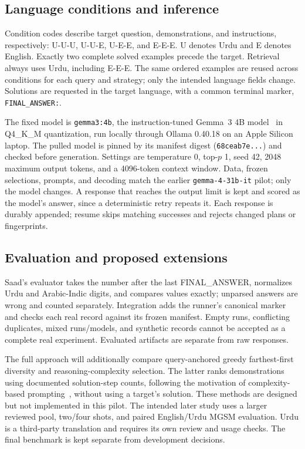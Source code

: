 \documentclass[conference]{IEEEtran}
\begin{document}
\subsection{Language conditions and inference}
Condition codes describe target question, demonstrations, and instructions, respectively: U-U-U, U-U-E, U-E-E, and E-E-E. U denotes Urdu and E denotes English. Exactly two complete solved examples precede the target. Retrieval always uses Urdu, including E-E-E. The same ordered examples are reused across conditions for each query and strategy; only the intended language fields change. Solutions are requested in the target language, with a common terminal marker, \texttt{FINAL\_ANSWER:}.

The fixed model is \texttt{gemma3:4b}, the instruction-tuned Gemma~3 4B model~\cite{gemma} in Q4\_K\_M quantization, run locally through Ollama 0.40.18 on an Apple Silicon laptop. The pulled model is pinned by its manifest digest (\texttt{68ceab7e...}) and checked before generation. Settings are temperature 0, top-$p$ 1, seed 42, 2048 maximum output tokens, and a 4096-token context window. Data, frozen selections, prompts, and decoding match the earlier \texttt{gemma-4-31b-it} pilot; only the model changes. A response that reaches the output limit is kept and scored as the model's answer, since a deterministic retry repeats it. Each response is durably appended; resume skips matching successes and rejects changed plans or fingerprints.

\subsection{Evaluation and proposed extensions}
Saad's evaluator takes the number after the last FINAL\_ANSWER, normalizes Urdu and Arabic-Indic digits, and compares values exactly; unparsed answers are wrong and counted separately. Integration adds the runner's canonical marker and checks each real record against its frozen manifest. Empty runs, conflicting duplicates, mixed runs/models, and synthetic records cannot be accepted as a complete real experiment. Evaluated artifacts are separate from raw responses.

The full approach will additionally compare query-anchored greedy farthest-first diversity and reasoning-complexity selection. The latter ranks demonstrations using documented solution-step counts, following the motivation of complexity-based prompting~\cite{fu}, without using a target's solution. These methods are designed but not implemented in this pilot. The intended later study uses a larger reviewed pool, two/four shots, and paired English/Urdu MGSM evaluation. Urdu is a third-party translation and requires its own review and usage checks. The final benchmark is kept separate from development decisions.
\end{document}
